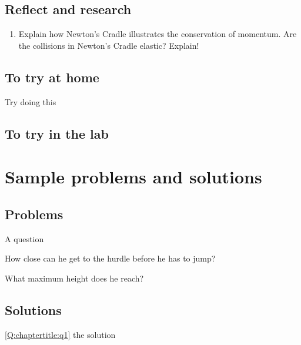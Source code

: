 \subsection{Reflect and research}

\begin{enumerate}
\item Explain how Newton's Cradle illustrates the conservation of momentum. Are the collisions in Newton's Cradle elastic? Explain! 
\end{enumerate}
\subsection{To try at home}

\begin{tQuestion}Try doing this \end{tQuestion}

\subsection{To try in the lab}

\newpage
\section{Sample problems and solutions}
\subsection{Problems}
\begin{problemParts}{A question\label{Q:chaptertitle:q1}}
\item How close can he get to the hurdle before he has to jump?
\item What maximum height does he reach?
\end{problemParts}

\newpage
\subsection{Solutions}
\begin{solution}{\ref{Q:chaptertitle:q1}}
{
the solution
}
\end{solution}

